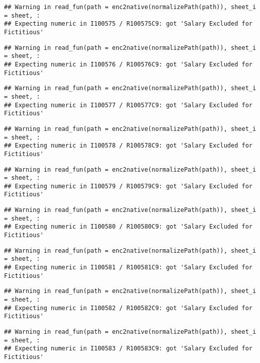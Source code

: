 \documentclass[
]{article}
\begin{document}
\begin{verbatim}
## Warning in read_fun(path = enc2native(normalizePath(path)), sheet_i = sheet, :
## Expecting numeric in I100575 / R100575C9: got 'Salary Excluded for Fictitious'
\end{verbatim}

\begin{verbatim}
## Warning in read_fun(path = enc2native(normalizePath(path)), sheet_i = sheet, :
## Expecting numeric in I100576 / R100576C9: got 'Salary Excluded for Fictitious'
\end{verbatim}

\begin{verbatim}
## Warning in read_fun(path = enc2native(normalizePath(path)), sheet_i = sheet, :
## Expecting numeric in I100577 / R100577C9: got 'Salary Excluded for Fictitious'
\end{verbatim}

\begin{verbatim}
## Warning in read_fun(path = enc2native(normalizePath(path)), sheet_i = sheet, :
## Expecting numeric in I100578 / R100578C9: got 'Salary Excluded for Fictitious'
\end{verbatim}

\begin{verbatim}
## Warning in read_fun(path = enc2native(normalizePath(path)), sheet_i = sheet, :
## Expecting numeric in I100579 / R100579C9: got 'Salary Excluded for Fictitious'
\end{verbatim}

\begin{verbatim}
## Warning in read_fun(path = enc2native(normalizePath(path)), sheet_i = sheet, :
## Expecting numeric in I100580 / R100580C9: got 'Salary Excluded for Fictitious'
\end{verbatim}

\begin{verbatim}
## Warning in read_fun(path = enc2native(normalizePath(path)), sheet_i = sheet, :
## Expecting numeric in I100581 / R100581C9: got 'Salary Excluded for Fictitious'
\end{verbatim}

\begin{verbatim}
## Warning in read_fun(path = enc2native(normalizePath(path)), sheet_i = sheet, :
## Expecting numeric in I100582 / R100582C9: got 'Salary Excluded for Fictitious'
\end{verbatim}

\begin{verbatim}
## Warning in read_fun(path = enc2native(normalizePath(path)), sheet_i = sheet, :
## Expecting numeric in I100583 / R100583C9: got 'Salary Excluded for Fictitious'
\end{verbatim}
\end{document}
